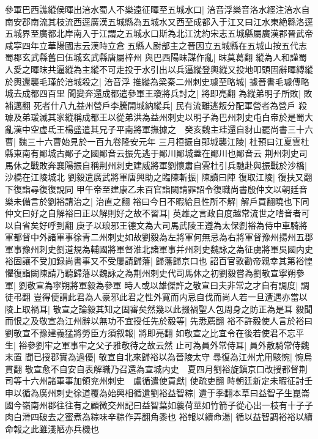 參軍巴西譙縱侯暉出涪水蜀人不樂遠征暉至五城水口|{
	涪音浮樂音洛水經注涪水自南安郡南流其枝流西逕廣漢五城縣為五城水又西至成都入于江又曰江水東絶緜洛逕五城界至廣都北岸南入于江謂之五城水口斯為北江沈約宋志五城縣屬廣漢郡晉武帝咸寜四年立華陽國志云漢時立倉五縣人尉部主之晉因立五城縣在五城山按五代志蜀郡玄武縣舊曰伍城玄武縣唐屬梓州}
與巴西陽昧謀作亂|{
	昩莫葛翻}
縱為人和謹蜀人愛之暉昩共逼縱為主縱不可走投于水引出以兵逼縱登輿縱又投地叩頭固辭暉縛縱於輿還襲毛瑾於涪城殺之|{
	涪音浮}
推縱為梁秦二州刺史璩至略城|{
	據晉書毛璩傳略城去成都四百里}
聞變奔還成都遣參軍王瓊將兵討之|{
	將即亮翻}
為縱弟明子所敗|{
	敗補邁翻}
死者什八九益州營戶李騰開城納縱兵|{
	民有流離逃叛分配軍營者為營戶}
殺璩及弟瑗滅其家縱稱成都王以從弟洪為益州刺史以明子為巴州刺史屯白帝於是蜀大亂漢中空虚氐王楊盛遣其兄子平南將軍撫據之　癸亥魏主珪還自豺山罷尚書三十六曹|{
	魏三十六曹始見於一百九卷隆安元年}
三月桓振自鄖城襲江陵|{
	杜預曰江夏雲杜縣東南有鄖城古鄖子之國鄖音云振先逃于鄖川鄖城蓋在鄖川也鄖音云}
荆州刺史司馬休之戰敗奔襄陽振自稱荆州刺史建威將軍劉懷肅自雲杜引兵馳赴與振戰於沙橋|{
	沙橋在江陵城北}
劉毅遣廣武將軍唐興助之臨陳斬振|{
	陳讀曰陣}
復取江陵|{
	復扶又翻下復詣尋復復說同}
甲午帝至建康乙未百官詣闕請罪詔令復職尚書殷仲文以朝廷音樂未備言於劉裕請治之|{
	治直之翻}
裕曰今日不暇給且性所不解|{
	解戶買翻曉也下同}
仲文曰好之自解裕曰正以解則好之故不習耳|{
	英雄之言政自度越常流世之嗜音者可以自省矣好呼到翻}
庚子以琅邪王德文為大司馬武陵王遵為太保劉裕為侍中車騎將軍都督中外諸軍事徐青二州刺史如故劉毅為左將軍何無忌為右將軍督豫州揚州五郡軍事豫州刺史劉道規為輔國將軍督淮北諸軍事并州刺史魏詠之為征虜將軍吳國内史裕固讓不受加録尚書事又不受屢請歸藩|{
	歸藩歸京口也}
詔百官敦勸帝親幸其第裕惶懼復詣闕陳請乃聽歸藩以魏詠之為荆州刺史代司馬休之初劉毅嘗為劉敬宣寧朔參軍|{
	劉敬宣為寜朔將軍毅為參軍}
時人或以雄傑許之敬宣曰夫非常之才自有調度|{
	調徒弔翻}
豈得便謂此君為人豪邪此君之性外寛而内忌自伐而尚人若一旦遭遇亦當以陵上取禍耳|{
	敬宣之論毅其知之固審矣然幾以此掇禍聖人包周身之防正為是耳}
毅聞而恨之及敬宣為江州辭以無功不宜授任先於毅等|{
	先悉薦翻}
裕不許毅使人言於裕曰劉敬宣不豫建義猛將勞臣方須叙報|{
	將即亮翻}
如敬宣之比宜令在後若使君不忘平生|{
	裕參劉牢之軍事牢之父子雅敬待之故云然}
止可為員外常侍耳|{
	員外散騎常侍魏末置}
聞已授郡實為過優|{
	敬宣自北來歸裕以為晉陵太守}
尋復為江州尤用駭惋|{
	惋烏貫翻}
敬宣愈不自安自表解職乃召還為宣城内史　夏四月劉裕旋鎮京口改授都督荆司等十六州諸軍事加領兖州刺史　盧循遣使貢獻|{
	使疏吏翻}
時朝廷新定未暇征討壬申以循為廣州刺史徐道覆為始興相循遺劉裕益智粽|{
	遺于季翻本草曰益智子生崑崙國今嶺南州郡往往有之顧微交州記曰益智葉如蘘荷莖如竹箭子從心出一枝有十子子肉白滑四破去之蜜煮為粽味辛粽作弄翻角黍也}
裕報以續命湯|{
	循以益智調裕裕以續命報之此雖淺陋亦兵機也}
